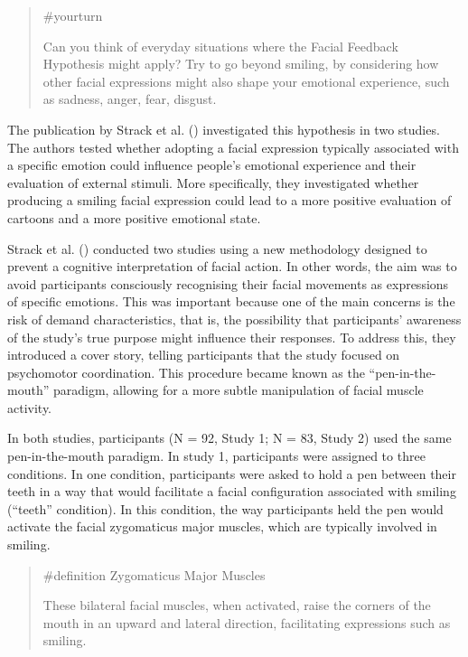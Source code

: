 \documentclass[
  letterpaper,
]{book}
\begin{document}
\begin{quote}
{\#yourturn}

Can you think of everyday situations where the Facial Feedback
Hypothesis might apply? Try to go beyond smiling, by considering how
other facial expressions might also shape your emotional experience,
such as sadness, anger, fear, disgust.
\end{quote}

The publication by Strack et al.
() investigated this
hypothesis in two studies. The authors tested whether adopting a facial
expression typically associated with a specific emotion could influence
people's emotional experience and their evaluation of external stimuli.
More specifically, they investigated whether producing a smiling facial
expression could lead to a more positive evaluation of cartoons and a
more positive emotional state.

Strack et al. () conducted
two studies using a new methodology designed to prevent a cognitive
interpretation of facial action. In other words, the aim was to avoid
participants consciously recognising their facial movements as
expressions of specific emotions. This was important because one of the
main concerns is the risk of demand characteristics, that is, the
possibility that participants' awareness of the study's true purpose
might influence their responses. To address this, they introduced a
cover story, telling participants that the study focused on psychomotor
coordination. This procedure became known as the ``pen-in-the-mouth''
paradigm, allowing for a more subtle manipulation of facial muscle
activity.

In both studies, participants (N = 92, Study 1; N = 83, Study 2) used
the same pen-in-the-mouth paradigm. In study 1, participants were
assigned to three conditions. In one condition, participants were asked
to hold a pen between their teeth in a way that would facilitate a
facial configuration associated with smiling (``teeth'' condition). In
this condition, the way participants held the pen would activate the
facial zygomaticus major muscles, which are typically involved in
smiling.

\begin{quote}
\label{def-zygomaticusmajor}{\#definition} Zygomaticus
Major Muscles

These bilateral facial muscles, when activated, raise the corners of the
mouth in an upward and lateral direction, facilitating expressions such
as smiling.
\end{quote}
\end{document}
